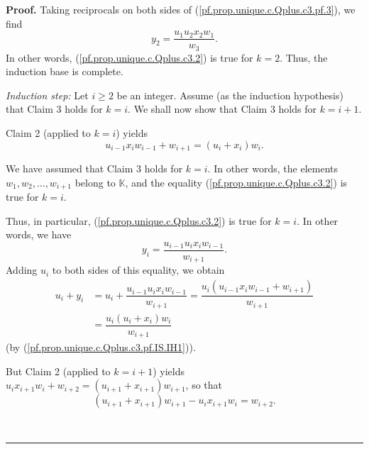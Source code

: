 \documentclass[numbers=enddot,12pt,final,onecolumn,notitlepage]{scrartcl}%
\theoremstyle{definition}
\newenvironment{proof}[1][Proof]{\noindent\textbf{#1.} }{\ \rule{0.5em}{0.5em}}
\newenvironment{verlong}{}{}
\begin{document}
\begin{verlong}
\begin{proof}
Taking reciprocals on both sides of (\ref{pf.prop.unique.c.Qplus.c3.pf.3}), we
find%
\[
y_{2}=\dfrac{u_{1}u_{2}x_{2}w_{1}}{w_{3}}.
\]
In other words, (\ref{pf.prop.unique.c.Qplus.c3.2}) is true for $k=2$. Thus,
the induction base is complete.

\textit{Induction step:} Let $i\geq2$ be an integer. Assume (as the induction
hypothesis) that Claim 3 holds for $k=i$. We shall now show that Claim 3 holds
for $k=i+1$.

Claim 2 (applied to $k=i$) yields%
\begin{equation}
u_{i-1}x_{i}w_{i-1}+w_{i+1}=\left(  u_{i}+x_{i}\right)  w_{i}.
\label{pf.prop.unique.c.Qplus.c3.pf.IS.IH1}%
\end{equation}


We have assumed that Claim 3 holds for $k=i$. In other words, the elements
$w_{1},w_{2},\ldots,w_{i+1}$ belong to $\mathbb{K}$, and the equality
(\ref{pf.prop.unique.c.Qplus.c3.2}) is true for $k=i$.

Thus, in particular, (\ref{pf.prop.unique.c.Qplus.c3.2}) is true for $k=i$. In
other words, we have%
\begin{equation}
y_{i}=\dfrac{u_{i-1}u_{i}x_{i}w_{i-1}}{w_{i+1}}.
\label{pf.prop.unique.c.Qplus.c3.pf.IS.IH2}%
\end{equation}
Adding $u_{i}$ to both sides of this equality, we obtain%
\begin{align}
u_{i}+y_{i}  &  =u_{i}+\dfrac{u_{i-1}u_{i}x_{i}w_{i-1}}{w_{i+1}}=\dfrac
{u_{i}\left(  u_{i-1}x_{i}w_{i-1}+w_{i+1}\right)  }{w_{i+1}}\nonumber\\
&  =\dfrac{u_{i}\left(  u_{i}+x_{i}\right)  w_{i}}{w_{i+1}}
\label{pf.prop.unique.c.Qplus.c3.pf.IS.3}%
\end{align}
(by (\ref{pf.prop.unique.c.Qplus.c3.pf.IS.IH1})).

But Claim 2 (applied to $k=i+1$) yields $u_{i}x_{i+1}w_{i}+w_{i+2}=\left(
u_{i+1}+x_{i+1}\right)  w_{i+1}$, so that
\begin{equation}
\left(  u_{i+1}+x_{i+1}\right)  w_{i+1}-u_{i}x_{i+1}w_{i}=w_{i+2}.
\label{pf.prop.unique.c.Qplus.c3.pf.IS.5}%
\end{equation}



\end{proof}
\end{verlong}
\end{document}
